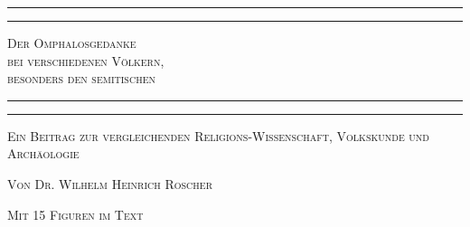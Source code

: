 \documentclass[a4paper, 11pt, oneside]{article}
\begin{document}
\begin{titlepage} %
	\centering %

	
	\rule{\textwidth}{1.6pt}\vspace*{-\baselineskip}\vspace*{2pt} %
	\rule{\textwidth}{0.4pt} %
	
	\vspace{1\baselineskip} %
	
	{\scshape\Huge Der Omphalosgedanke \\bei verschiedenen Völkern, \\besonders den semitischen}
	
	\vspace{1\baselineskip} %

	\rule{\textwidth}{0.4pt}\vspace*{-\baselineskip}\vspace{3.2pt} %
	\rule{\textwidth}{1.6pt} %
	
	\vspace{1\baselineskip} %
	
	
        {\scshape Ein Beitrag zur vergleichenden Religions-Wissenschaft, Volkskunde und Archäologie} %
	
	\vspace*{1\baselineskip} %

        {\scshape Von \Large Dr. Wilhelm Heinrich Roscher}

	\vspace*{1\baselineskip} %

        {\scshape\small Mit 15 Figuren im Text}

	\vspace{1\baselineskip}


        \vspace*{\fill}


\end{titlepage}
\end{document}
